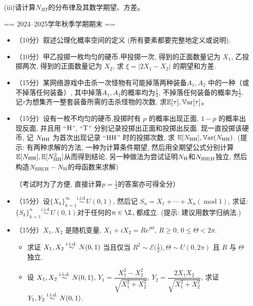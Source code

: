 (iii)请计算$N_{HT}$的分布律及其数学期望、方差。


== 2024--2025学年秋季学期期末 ==
\begin{itemize}
    \item [一、]（10分）叙述公理化概率空间的定义 (所有要素都要完整地定义或说明).

    \item [二、]（10分）甲乙投掷一枚均匀的硬币.甲投掷一次, 得到的正面数量记为 $X_1$, 乙投掷两次, 得到的正面数量记为 $X_2$, 求 $\xi = | 2X_1 - X_2 |$ 的期望和方差.

    \item [三、]（15分）某网络游戏中击杀一次怪物有可能掉落两种装备$A_1, A_2$
    中的一种（或不掉落任何装备）, 其中掉落$A_1,A_2$的概率均为$\frac14$, 
    不掉落任何装备的概率为$\frac12$. 记$\tau$为想集齐一整套装备所需的击杀怪物的次数, 
    求$\mathbb{E}[\tau],\mathbb{V}\mathrm{ar}[\tau]$。

    \item [四、]（15分）设有一枚不均匀的硬币,投掷时有 $p$ 的概率出现正面, 
    $1-p$ 的概率出现反面, 并且用 ``$\mathrm{H}$'', ``$\mathrm{T}$'' 分别记录投掷出正面和投掷出反面.
    现一直投掷该硬币, 记 $N_{\mathrm{H}\mathrm{H}}$ 为首次出现记录 ``$\mathrm{H}\mathrm{H}$'' 时的投掷次数, 
    求 $\mathbb{E}[N_{\mathrm{H}\mathrm{H}}],\mathbb{V}\mathrm{ar} (N_{\mathrm{H}\mathrm{H}})$.
    (提示: 有两种求解的方法, 一种为计算条件期望,
    然后用全期望公式分别计算$\mathbb{E}[N_{\mathrm{H}\mathrm{H}}],\mathbb{E}[N_{\mathrm{H}\mathrm{H}}^2]$从而得到结论,
    另一种做法为尝试证明$N_{\mathrm{H}}$和$N_{\mathrm{H}\mathrm{H}|\mathrm{H}}$独立, 
    然后构造$N_{\mathrm{H}\mathrm{H}|\mathrm{H}} - N_{\mathrm{H}}$的母函数来求解)

    （考试时为了方便, 直接计算$p = \frac12$的答案亦可得全分）

    \item [五、]（15分）设$\{X_k\}_{k=1}^{\infty}\stackrel{\mathrm{i.i.d.}}{\sim} U(0,1)$, 
    然后记 $S_n = X_1 + \cdots + X_n (\operatorname{mod} 1)$,
    求证: $\{S_k\}_{k=1}^{n} \stackrel{\mathrm{i.i.d.}}{\sim} U(0,1)$对于任何的$n \in \Z_+$都成立. (提示: 建议用数学归纳法.)

    \item [六、]（15分）$X_1, X_2$ 是随机变量, $X_1 + iX_2 = Re^{i\Theta}$,
     $R \ge 0$, $0 \le \Theta \lt 2\pi$.
    \begin{itemize} 
        \item [(1)] 求证 $X_1, X_2 \stackrel{\mathrm{i.i.d.}}{\sim} N(0, 1)$ 当且仅当
            $R^2 \sim \mathcal{E}\big(\frac{1}{2}\big), \Theta \sim U(0, 2\pi)$ 且 $R$ 与 $\Theta$ 独立.
        \item [(2)] 设 $X_1, X_2 \stackrel{\mathrm{i.i.d.}}{\sim} N(0, 1)$,
            $Y_1 = \dfrac {X_1^2 - X_2^2} {\sqrt{X_1^2 + X_2^2}}$,
            $Y_2 = \dfrac {2 X_1 X_2} {\sqrt{X_1^2 + X_2^2}}$,
            求证 $Y_1, Y_2 \stackrel{\mathrm{i.i.d.}}{\sim} N(0, 1)$.
    \end{itemize}


\end{itemize}
